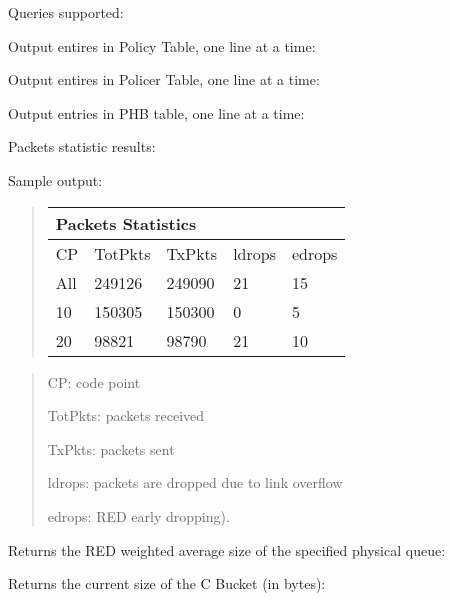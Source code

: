Queries supported:
\begin{description}
\item
Output entires in Policy Table, one line at a time:


\item
Output entires in Policer Table, one line at a time:


\item
Output entries in PHB table, one line at a time:


\item
Packets statistic results:


Sample output:

\begin{quote}
\begin{tabular}{lllll}
\multicolumn{5}{l}{Packets Statistics}  \\
\hline\hline
 CP & TotPkts & TxPkts & ldrops & edrops \\
\hline
All & 249126 & 249090 &    21 &      15  \\
 10 & 150305 & 150300 &     0 &       5  \\
 20 & 98821  &  98790 &    21 &      10  \\
\end{tabular}
\end{quote}

\begin{quote}
CP: code point

TotPkts: packets received

TxPkts: packets sent

ldrops: packets are dropped due to link overflow
	               
edrops: RED early dropping).
\end{quote}

\item
Returns the RED weighted average size of the specified physical queue:


\item
Returns the current size of the C Bucket (in bytes):


\end{description}


